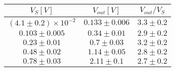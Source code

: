 \begin{tabular}{ccc}
\hline
	$V_S[V]$ & $V_{out}[V]$ & $V_{out}/V_S$\\ 
\hline
	$(4.1\pm0.2)\times 10^{-2}$ & $0.133\pm0.006$ & $3.3\pm0.2$ \\
	$0.103\pm0.005$ & $0.34\pm0.01$ & $2.9\pm0.2$ \\
	$0.23\pm0.01$ & $0.7\pm0.03$ & $3.2\pm0.2$ \\
	$0.48\pm0.02$ & $1.14\pm0.05$ & $2.8\pm0.2$ \\
	$0.78\pm0.03$ & $2.11\pm0.1$ & $2.7\pm0.2$ \\
\hline
\end{tabular}
